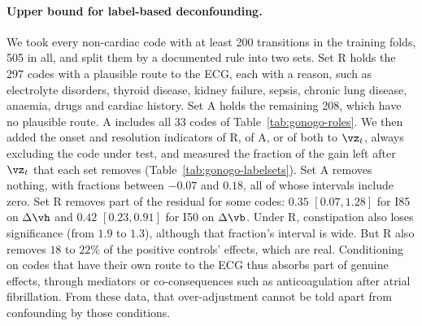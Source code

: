 \paragraph{Upper bound for label-based deconfounding.} We took every non-cardiac code with at least 200 transitions in the training folds, 505 in all, and split them by a documented rule into two sets. Set R holds the 297 codes with a plausible route to the ECG, each with a reason, such as electrolyte disorders, thyroid disease, kidney failure, sepsis, chronic lung disease, anaemia, drugs and cardiac history. Set A holds the remaining 208, which have no plausible route. A includes all 33 codes of Table~\ref{tab:gonogo-roles}. We then added the onset and resolution indicators of R, of A, or of both to $\vz_t$, always excluding the code under test, and measured the fraction of the gain left after $\vz_t$ that each set removes (Table~\ref{tab:gonogo-labelsets}). Set A removes nothing, with fractions between $-0.07$ and $0.18$, all of whose intervals include zero. Set R removes part of the residual for some codes: $0.35$ $[0.07, 1.28]$ for I85 on $\Delta\vh$ and $0.42$ $[0.23, 0.91]$ for I50 on $\Delta\vb$. Under R, constipation also loses significance (from $1.9$ to $1.3$), although that fraction's interval is wide. But R also removes $18$ to $22\%$ of the positive controls' effects, which are real. Conditioning on codes that have their own route to the ECG thus absorbs part of genuine effects, through mediators or co-consequences such as anticoagulation after atrial fibrillation. From these data, that over-adjustment cannot be told apart from confounding by those conditions.

